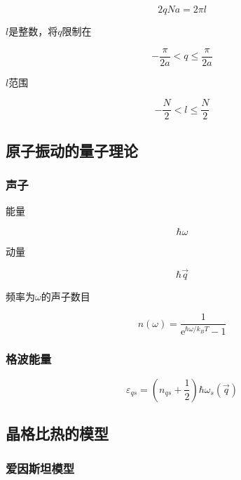 \documentclass{article}
\newcommand*{\me}{\mathrm{e}}
\begin{document}
\begin{multicols}{2}
\begin{equation*}
  2qNa=2\pi l
\end{equation*}

$l$是整数，将$q$限制在

\begin{equation*}
  - \dfrac{\pi}{2a} < q \leq \dfrac{\pi}{2a}
\end{equation*}

$l$范围

\begin{equation*}
  - \dfrac{N}{2} < l \leq \dfrac{N}{2}
\end{equation*}

\subsection{原子振动的量子理论}

\subsubsection{声子}

能量

\begin{equation*}
  \hbar \omega
\end{equation*}

动量

\begin{equation*}
  \hbar \vec{q}
\end{equation*}

频率为$\omega$的声子数目

\begin{equation*}
  n \left( \omega \right) = \dfrac{1}{\me^{\hbar \omega / k_B T} - 1}
\end{equation*}

\subsubsection{格波能量}

\begin{equation*}
  \varepsilon_{qs} = \left( n_{qs} + \dfrac{1}{2} \right) \hbar \omega_s \left( \vec{q} \right)
\end{equation*}

\subsection{晶格比热的模型}

\subsubsection{爱因斯坦模型}


\end{multicols}
\end{document}
